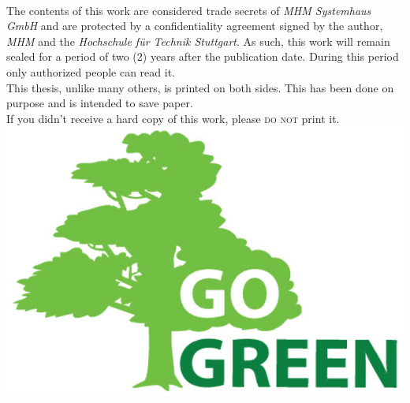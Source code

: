 \thispagestyle{empty}
{}

\vspace*{3cm}

\medskip

\begin{center}
\begingroup
            \color{Maroon} \\ \medskip 
        \endgroup
The contents of this work are considered trade secrets of \textit{MHM Systemhaus GmbH} and are protected by a confidentiality agreement signed by the author, \textit{MHM} and the \textit{Hochschule für Technik Stuttgart}. As such, this work will remain sealed for a period of two (2) years after the publication date. During this period only authorized people can read it.\\ \bigskip \smallskip
\bigskip
\bigskip
\bigskip 
    This thesis, unlike many others, is printed on both sides. This has been done on purpose and is intended to save paper. \\ \bigskip
    \bigskip
    If you didn't receive a hard copy of this work, please \textsc{do not} print it.\\ \bigskip \bigskip
    \includegraphics[width=.35\linewidth]{gfx/gogreen}
\end{center}